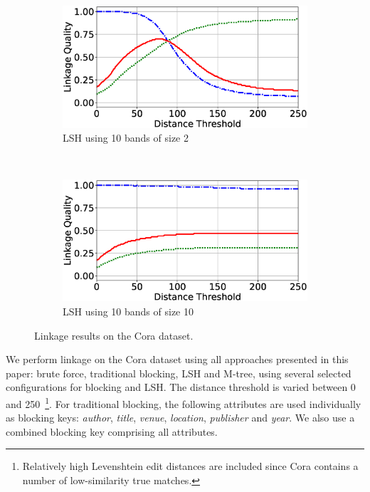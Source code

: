 \documentclass{llncs}
\begin{document}
\begin{figure}
\begin{subfigure}{.47\textwidth}
  \centering
\includegraphics[width=\textwidth]{figures/plotLQ-cora-lsh-10-2}
\caption{LSH using 10 bands of size 2}
\end{subfigure}%
~~
\begin{subfigure}{.47\textwidth}
  \centering
\includegraphics[width=\textwidth]{figures/plotLQ-cora-lsh-10-10}
\caption{LSH using 10 bands of size 10}
\end{subfigure}
\caption{Linkage results on the Cora dataset.}
\label{cora-quality}
\end{figure}

We perform linkage on the Cora dataset using all approaches presented in
this paper: brute force, traditional blocking, LSH and M-tree, using
several selected configurations for blocking and LSH. The distance
threshold is varied between 0 and 250~\footnote{Relatively high
Levenshtein edit distances are included since Cora contains a number of
low-similarity true matches.}. For traditional blocking, the following
attributes are used individually as blocking keys: \emph{author},
\emph{title}, \emph{venue}, \emph{location}, \emph{publisher} and
\emph{year}. We also use a combined blocking key comprising all
attributes.
\end{document}
